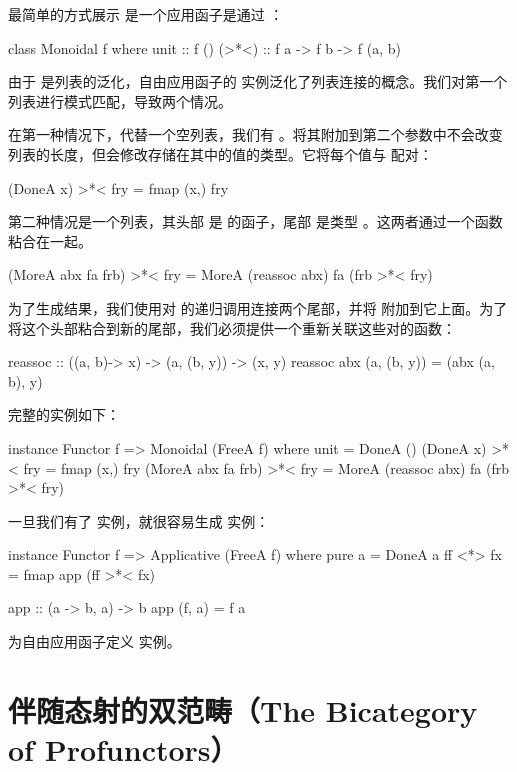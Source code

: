 \documentclass[DaoFP]{subfiles}
\begin{document}
 最简单的方式展示  是一个应用函子是通过 ：
 \begin{haskell}
  class Monoidal f where
  unit  :: f ()
  (>*<) :: f a -> f b -> f (a, b)
 \end{haskell}

 由于  是列表的泛化，自由应用函子的  实例泛化了列表连接的概念。我们对第一个列表进行模式匹配，导致两个情况。

 在第一种情况下，代替一个空列表，我们有 。将其附加到第二个参数中不会改变列表的长度，但会修改存储在其中的值的类型。它将每个值与  配对：
 \begin{haskell}
 (DoneA x) >*< fry = fmap (x,) fry
 \end{haskell}

 第二种情况是一个列表，其头部  是  的函子，尾部  是类型 。这两者通过一个函数  粘合在一起。
 \begin{haskell}
 (MoreA abx fa frb) >*< fry = MoreA (reassoc abx) fa (frb >*< fry)
 \end{haskell}
 为了生成结果，我们使用对 \hask{>*<} 的递归调用连接两个尾部，并将  附加到它上面。为了将这个头部粘合到新的尾部，我们必须提供一个重新关联这些对的函数：
 \begin{haskell}
  reassoc :: ((a, b)-> x) -> (a, (b, y)) -> (x, y)
  reassoc abx (a, (b, y)) = (abx (a, b), y)
 \end{haskell}

 完整的实例如下：
 \begin{haskell}
  instance Functor f => Monoidal (FreeA f) where
  unit = DoneA ()
  (DoneA x) >*< fry = fmap (x,) fry
  (MoreA abx fa frb) >*< fry = MoreA (reassoc abx) fa (frb >*< fry)
 \end{haskell}

 一旦我们有了  实例，就很容易生成  实例：
 \begin{haskell}
  instance Functor f => Applicative (FreeA f) where
  pure a = DoneA a
  ff <*> fx = fmap app (ff >*< fx)

  app :: (a -> b, a) -> b
  app (f, a) = f a
 \end{haskell}

 \begin{exercise}
  为自由应用函子定义  实例。
 \end{exercise}


 \section{伴随态射的双范畴（The Bicategory of Profunctors）}
\end{document}
